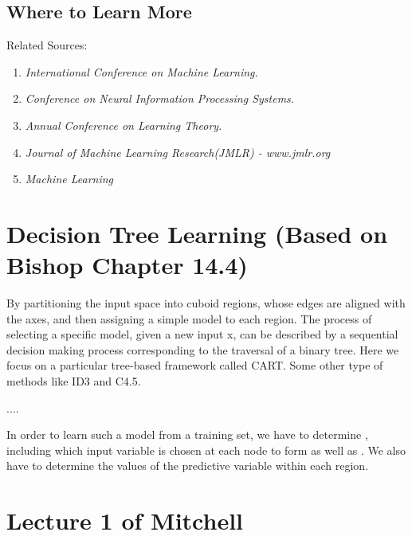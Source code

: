 \documentclass[twoside]{article}
\begin{document}
\subsection{Where to Learn More}
Related Sources:
\begin{enumerate}
\item \textit{International Conference on Machine Learning.}
\item \textit{Conference on Neural Information Processing Systems.}
\item  \textit{Annual Conference on Learning Theory.}
\item  \textit{Journal of Machine Learning Research(JMLR) - www.jmlr.org}
\item  \textit{Machine Learning}
\end{enumerate}

\section{Decision Tree Learning (Based on Bishop Chapter 14.4)} 
By partitioning the input space into cuboid regions, whose edges are aligned with the axes, and then assigning a simple model to each region. The process of selecting a specific model, given a new input x, can be described by a sequential decision making process corresponding to the traversal of a binary tree. Here we focus on a particular tree-based framework called CART. Some other type of methods like ID3 and C4.5. 

....

In order to learn such a model from a training set, we have to determine {\color{red}{the structure of the tree}}, including which input variable is chosen at each node to form {\color{red}{the split criterion}} as well as {\color{red}{the valued of the threshold parameter $\theta_i$ for the split}}. We also have to determine the values of the predictive variable within each region.



\section{Lecture 1 of Mitchell}
\end{document}
